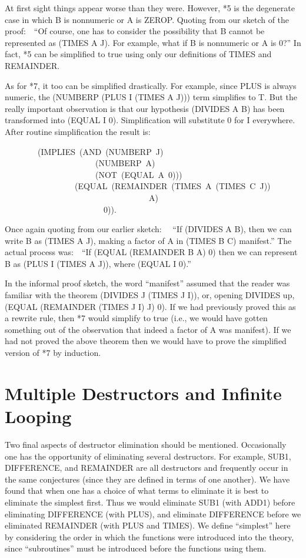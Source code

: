 \documentclass[10pt]{book}
\newenvironment{pubasis}{\begin{flushleft}}{\end{flushleft}}
\begin{document}
At first sight things appear worse than they
were.
However, *5 is the degenerate case in which B is nonnumeric or 
A is ZEROP.  Quoting from our sketch of the proof:~~``Of course, one has to consider the possibility that B cannot be represented
as (TIMES A J).  For example, what if B is nonnumeric or A is 0?''
In fact, *5 can be simplified to true using only
our definitions of TIMES and REMAINDER.

As for *7, it too can be simplified drastically.  For example,
since PLUS is always numeric, the (NUMBERP (PLUS I (TIMES A J)))
term simplifies to T.  But the really important observation is that our
hypothesis (DIVIDES A B) has been transformed into (EQUAL I 0).
Simplification will substitute 0 for I everywhere.  After
routine simplification the result is:

\begin{pubasis}
~~~~~~~~(IMPLIES~(AND~(NUMBERP~J)\\
~~~~~~~~~~~~~~~~~~~~~~(NUMBERP~A)\\
~~~~~~~~~~~~~~~~~~~~~~(NOT~(EQUAL~A~0)))\\
~~~~~~~~~~~~~~~~~(EQUAL~(REMAINDER~(TIMES~A~(TIMES~C~J))\\
~~~~~~~~~~~~~~~~~~~~~~~~~~~~~~~~~~~A)\\
~~~~~~~~~~~~~~~~~~~~~~~~0)).\\
\end{pubasis}
Once again quoting from our earlier sketch:~~
``If (DIVIDES A B), then we can
write B as (TIMES A J), making a factor of A in (TIMES B C) manifest.''
The actual process was:~~``If (EQUAL (REMAINDER B A) 0) then we
can represent B as (PLUS I (TIMES A J)), where (EQUAL I 0).''

In the informal proof sketch, the word ``manifest'' assumed that the
reader was familiar with the
theorem (DIVIDES J (TIMES J I)), or, opening DIVIDES up, (EQUAL (REMAINDER (TIMES J I) J) 0).
If we had previously proved this as a rewrite rule, then *7 would
simplify to true (i.e., we would have gotten something out of the
observation that indeed a factor of A was manifest).  If we had not proved the above
theorem then we would have to prove the simplified version of *7
by induction.

\section{Multiple Destructors and Infinite Looping}
Two final aspects of destructor elimination should be mentioned.
Occasionally one has the opportunity of eliminating several destructors.
For example, SUB1, DIFFERENCE, and REMAINDER are all destructors and
frequently occur in the same conjectures (since they are defined
in terms of one another).  We have found that when one has a choice
of what terms to eliminate it is best to eliminate the simplest first.
Thus we would eliminate SUB1 (with ADD1) before eliminating
DIFFERENCE (with PLUS), and eliminate DIFFERENCE before we eliminated
REMAINDER (with PLUS and TIMES).  We  define ``simplest''
here by  considering the order in which the functions
were introduced into the theory,
since ``subroutines'' must be introduced before the functions using
them.
\end{document}
